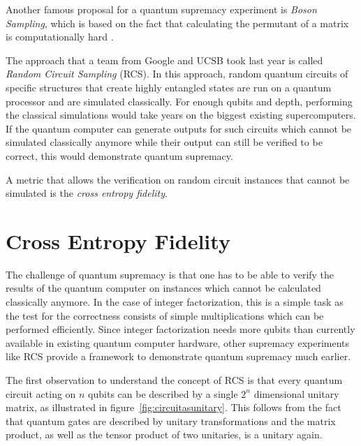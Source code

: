 Another famous proposal for a quantum supremacy experiment is \textit{Boson Sampling}, which is based on the
fact that calculating the permutant of a matrix is computationally hard \cite{aaronson2013boson}.

The approach that a team from Google and UCSB took last year is called \textit{Random
  Circuit Sampling} (RCS). In this approach, random quantum circuits of specific structures that create highly
entangled states are run on a quantum processor and are simulated classically. For
enough qubits and depth, performing the classical simulations would take years on the biggest existing supercomputers. If the quantum computer can generate outputs
for such circuits which cannot be simulated classically anymore while their output can still be
verified to be correct, this would demonstrate quantum supremacy. 

A metric that
allows the verification on random circuit instances that cannot be simulated is
the \textit{cross entropy fidelity}.

\section{Cross Entropy Fidelity}

The challenge of quantum supremacy is that one has to be able to verify the
results of the quantum computer on instances which cannot be calculated
classically anymore. In the case of integer factorization, this is a simple task
as the test for the correctness consists of simple multiplications which can be
performed efficiently. Since integer factorization needs more qubits than
currently available in existing quantum computer hardware, other supremacy
experiments like RCS provide a framework to demonstrate quantum supremacy much
earlier.

The first observation to understand the concept of RCS is that every quantum
circuit acting on $n$ qubits can be described by a single $2^n$ dimensional
unitary matrix, as illustrated in figure~\ref{fig:circuitasunitary}. This follows
from the fact that quantum gates are described by unitary transformations and
the matrix product, as well as the tensor product of two unitaries, is a unitary again.

